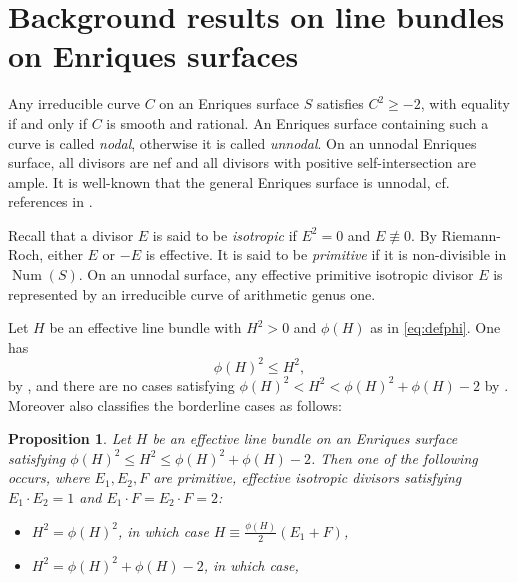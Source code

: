 \documentclass[11pt]{amsart}
\newtheorem{proposition}[thm]{Proposition}
\theoremstyle{definition}
\def\Num{\operatorname{Num}}
\begin{document}
\section{ Background results  on line bundles on Enriques surfaces} \label{sec:gen0}


Any irreducible curve $C$ on an Enriques surface $S$ satisfies $C^2 \geqslant -2$, with equality if and only if $C$ is smooth and rational.  An Enriques surface containing such a curve is called {\it nodal}, otherwise it is called {\it unnodal}. On an unnodal Enriques surface, all divisors are nef and all divisors with positive self-intersection are ample.  It is well-known that the general Enriques surface is  unnodal, cf. references in \cite[p.~577]{cos2}.  

Recall that a divisor $E$ is said to be {\it isotropic} if $E^2=0$ and $E \not \equiv 0$. 
By Riemann-Roch, either $E$ or $-E$ is effective. It is said to be  {\it primitive}  if it is non-divisible in $\Num(S)$.  On an unnodal surface, any effective primitive isotropic divisor $E$ is represented by an irreducible curve of arithmetic genus one. 

 Let $H$ be an effective
line bundle with $H^2 >0$ and $\phi(H)$  as in \eqref {eq:defphi}. One has 
\begin{equation}
  \label{eq:bound}
  \phi(H)^2 \leqslant H^2, 
\end{equation}
by \cite[Cor. 2.7.1]{cd}, and there  are no cases satisfying $\phi(H)^2 < H^2 < \phi(H)^2 +\phi(H)-2$ by \cite[Prop. 1.4]{KL1}. Moreover \cite[Prop. 1.4]{KL1} also classifies the borderline cases as follows:

\begin{proposition} \label{prop:bound}
  Let $H$ be an effective line bundle on an Enriques surface satisfying $\phi(H)^2 \leqslant H^2 \leqslant \phi(H)^2 +\phi(H)-2$. Then one of the following occurs,  where $E_1,E_2,F$ are primitive, effective isotropic divisors satisfying $E_1 \cdot E_2=1$ and $E_1 \cdot F=E_2 \cdot F=2$:  
\begin{itemize}
\item[(i)] $H^2=\phi(H)^2$, in which case $H \equiv \frac{\phi(H)}{2}\left(E_1+F\right)$,
\item[(ii)] $H^2 =\phi(H)^2 +\phi(H)-2$, in which case,\\
\end{itemize}
\end{proposition}
\end{document}
